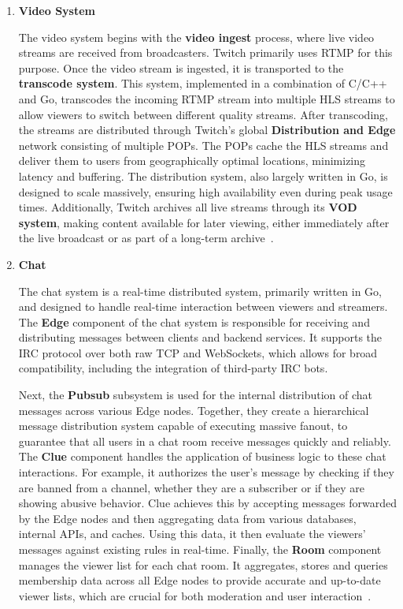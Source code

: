 \begin{enumerate}
    \item \textbf{Video System}
    
    The video system begins with the \textbf{video ingest} process, where live video streams are received from broadcasters. Twitch primarily uses \ac{RTMP} for this purpose. Once the video stream is ingested, it is transported to the \textbf{transcode system}. This system, implemented in a combination of C/C++ and Go, transcodes the incoming \ac{RTMP} stream into multiple \ac{HLS} streams to allow viewers to switch between different quality streams.
    After transcoding, the streams are distributed through Twitch's global \textbf{Distribution and Edge} network consisting of multiple \ac{POPs}. The \ac{POPs} cache the \ac{HLS} streams and deliver them to users from geographically optimal locations, minimizing latency and buffering. The distribution system, also largely written in Go, is designed to scale massively, ensuring high availability even during peak usage times. Additionally, Twitch archives all live streams through its \textbf{\ac{VOD} system}, making content available for later viewing, either immediately after the live broadcast or as part of a long-term archive~\parencite{twitch_engineering}.
    
    \item \textbf{Chat}

    The chat system is a real-time distributed system, primarily written in Go, and designed to handle real-time interaction between viewers and streamers. The \textbf{Edge} component of the chat system is responsible for receiving and distributing messages between clients and backend services. It supports the \ac{IRC} protocol over both raw TCP and WebSockets, which allows for broad compatibility, including the integration of third-party \ac{IRC} bots.
    
    Next, the \textbf{Pubsub} subsystem is used for the internal distribution of chat messages across various Edge nodes. Together, they create a hierarchical message distribution system capable of executing massive fanout, to guarantee that all users in a chat room receive messages quickly and reliably. The \textbf{Clue} component handles the application of business logic to these chat interactions. For example, it authorizes the user's message by checking if they are banned from a channel, whether they are a subscriber or if they are showing abusive behavior. Clue achieves this by accepting messages forwarded by the Edge nodes and then aggregating data from various databases, internal \ac{API}s, and caches. Using this data, it then evaluate the viewers' messages against existing rules in real-time. Finally, the \textbf{Room} component manages the viewer list for each chat room. It aggregates, stores and queries membership data across all Edge nodes to provide accurate and up-to-date viewer lists, which are crucial for both moderation and user interaction~\parencite{twitch_chat}.


\end{enumerate}
